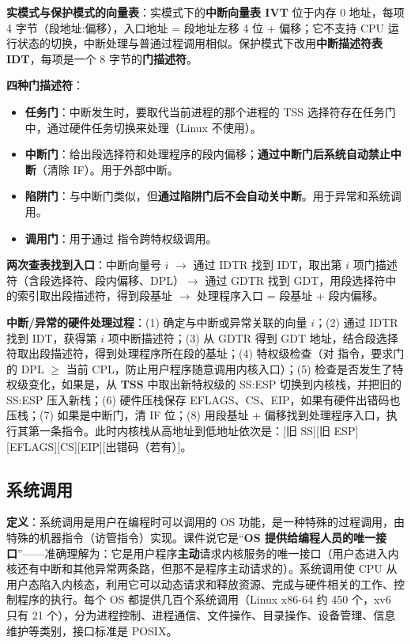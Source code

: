 \textbf{实模式与保护模式的向量表}：实模式下的\textbf{中断向量表 IVT} 位于内存 0 地址，每项 4 字节（段地址:偏移），入口地址 = 段地址左移 4 位 + 偏移；它不支持 CPU 运行状态的切换，中断处理与普通过程调用相似。保护模式下改用\textbf{中断描述符表 IDT}，每项是一个 8 字节的\textbf{门描述符}。

\textbf{四种门描述符}：
\begin{itemize}
    \item \textbf{任务门}：中断发生时，要取代当前进程的那个进程的 TSS 选择符存在任务门中，通过硬件任务切换来处理（Linux 不使用）。
    \item \textbf{中断门}：给出段选择符和处理程序的段内偏移；\textbf{通过中断门后系统自动禁止中断}（清除 IF）。用于外部中断。
    \item \textbf{陷阱门}：与中断门类似，但\textbf{通过陷阱门后不会自动关中断}。用于异常和系统调用。
    \item \textbf{调用门}：用于通过  指令跨特权级调用。
\end{itemize}

\textbf{两次查表找到入口}：中断向量号 $i$ $\to$ 通过 IDTR 找到 IDT，取出第 $i$ 项门描述符（含段选择符、段内偏移、DPL）$\to$ 通过 GDTR 找到 GDT，用段选择符中的索引取出段描述符，得到段基址 $\to$ 处理程序入口 = 段基址 + 段内偏移。

\textbf{中断/异常的硬件处理过程}：(1) 确定与中断或异常关联的向量 $i$；(2) 通过 IDTR 找到 IDT，获得第 $i$ 项中断描述符；(3) 从 GDTR 得到 GDT 地址，结合段选择符取出段描述符，得到处理程序所在段的基址；(4) 特权级检查（对  指令，要求门的 DPL $\ge$ 当前 CPL，防止用户程序随意调用内核入口）；(5) 检查是否发生了特权级变化，如果是，从 \textbf{TSS} 中取出新特权级的 SS:ESP 切换到内核栈，并把旧的 SS:ESP 压入新栈；(6) 硬件压栈保存 EFLAGS、CS、EIP，如果有硬件出错码也压栈；(7) 如果是中断门，清 IF 位；(8) 用段基址 + 偏移找到处理程序入口，执行其第一条指令。此时内核栈从高地址到低地址依次是：[旧 SS][旧 ESP][EFLAGS][CS][EIP][出错码（若有）]。

\subsection{系统调用}

\textbf{定义}：系统调用是用户在编程时可以调用的 OS 功能，是一种特殊的过程调用，由特殊的机器指令（访管指令）实现。课件说它是“\textbf{OS 提供给编程人员的唯一接口}”——准确理解为：它是用户程序\textbf{主动}请求内核服务的唯一接口（用户态进入内核还有中断和其他异常两条路，但那不是程序主动请求的）。系统调用使 CPU 从用户态陷入内核态，利用它可以动态请求和释放资源、完成与硬件相关的工作、控制程序的执行。每个 OS 都提供几百个系统调用（Linux x86-64 约 450 个，xv6 只有 21 个），分为进程控制、进程通信、文件操作、目录操作、设备管理、信息维护等类别，接口标准是 POSIX。

